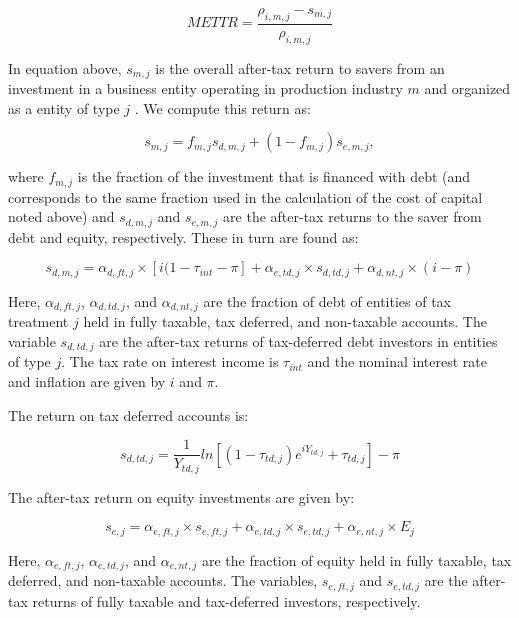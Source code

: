 \documentclass[article,11pt,letterpaper,fleqn]{article}
\theoremstyle{definition}
\numberwithin{equation}{section}
\begin{document}
\begin{equation}
METTR = \frac{\rho_{i,m,j}-s_{m,j}}{\rho_{i,m,j}}
\end{equation}

\noindent\noindent In equation above, $s_{m,j}$ is the overall after-tax return to savers from an investment in a business entity operating in production industry $m$ and organized as a entity of type $j$ .  We compute this return as:

\begin{equation}
s_{m,j} = f_{m,j}s_{d,m,j} + (1-f_{m,j})s_{e,m,j},
\end{equation}

\noindent\noindent where $f_{m,j}$ is the fraction of the investment that is financed with debt (and corresponds to the same fraction used in the calculation of the cost of capital noted above) and $s_{d,m,j}$ and $s_{e,m,j}$ are the after-tax returns to the saver from debt and equity, respectively.  These in turn are found as:

\begin{equation}
s_{d,m,j} = \alpha_{d,ft,j}\times \left[i(1-\tau_{int}-\pi\right] + \alpha_{e,td,j}\times s_{d,td,j} + \alpha_{d,nt,j}\times (i-\pi)
\end{equation}

Here, $\alpha_{d,ft,j}$, $\alpha_{d,td,j}$, and $\alpha_{d,nt,j}$ are the fraction of debt of entities of tax treatment $j$ held in fully taxable, tax deferred, and non-taxable accounts.  The variable $s_{d,td,j}$ are the after-tax returns of tax-deferred debt investors in entities of type $j$.  The tax rate on interest income is $\tau_{int}$ and the nominal interest rate and inflation are given by $i$ and $\pi$.


 The return on tax deferred accounts is:
 
 \begin{equation}
s_{d,td,j} = \frac{1}{Y_{td,j}}ln \left[(1-\tau_{td,j})e^{iY_{td,j}}+\tau_{td,j}\right]-\pi
\end{equation}


The after-tax return on equity investments are given by:

\begin{equation}
s_{e,j} = \alpha_{e,ft,j}\times s_{e,ft,j} + \alpha_{e,td,j}\times s_{e,td,j} + \alpha_{e,nt,j}\times E_{j}
\end{equation}

 

Here, $\alpha_{e,ft,j}$, $\alpha_{e,td,j}$, and $\alpha_{e,nt,j}$ are the fraction of equity held in fully taxable, tax deferred, and non-taxable accounts.  The variables, $s_{e,ft,j}$ and $s_{e,td,j}$ are the after-tax returns of fully taxable and tax-deferred investors, respectively.  
\end{document}
